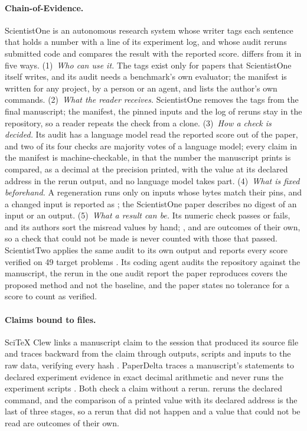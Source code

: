 \paragraph{Chain-of-Evidence.} ScientistOne \citep{meng2026scientistone} is an autonomous
research system whose writer tags each sentence that holds a number with a line of its
experiment log, and whose audit reruns submitted code and compares the result with the reported
score.  differs from it in five ways. (1)~\emph{Who can use it.} The
tags exist only for papers that ScientistOne itself writes, and its audit needs a benchmark's
own evaluator; the  manifest is written for any project, by a person or an agent, and
lists the author's own commands. (2)~\emph{What the reader receives.} ScientistOne removes the tags from
the final manuscript; the manifest, the pinned inputs and the log of reruns stay in the
repository, so a reader repeats the check from a clone. (3)~\emph{How a check is decided.} Its
audit has a language model read the reported score out of the paper, and two of its four checks
are majority votes of a language model; every claim in the manifest is machine-checkable, in
that the number the manuscript prints is compared, as a decimal at the precision printed, with
the value at its declared address in the rerun output, and no language model takes part. (4)~\emph{What is fixed beforehand.} A regeneration
runs only on inputs whose bytes match their pins, and a changed input is reported as
; the ScientistOne paper describes no digest of an input or an output. (5)~\emph{What a result can be.}
Its numeric check passes or fails, and its authors sort the misread values by hand;
,  and  are outcomes of their own, so a check that
could not be made is never counted with those that passed. ScientistTwo applies the same audit
to its own output and reports every score verified on 49 target problems
\citep{nam2026scientisttwo}. Its coding agent audits the repository against the manuscript, the
rerun in the one audit report the paper reproduces covers the proposed method and not the
baseline, and the paper states no tolerance for a score to count as verified.

\paragraph{Claims bound to files.} SciTeX Clew links a manuscript claim to the session that
produced its source file and traces backward from the claim through outputs, scripts and inputs
to the raw data, verifying every hash \citep{watanabe2026clew}. PaperDelta traces a manuscript's
statements to declared experiment evidence in exact decimal arithmetic and never runs the
experiment scripts \citep{paperdelta2026}. Both check a claim without a rerun.  reruns the declared command, and the comparison of a printed value with its declared
address is the last of three stages, so a rerun that did not happen and a value that could not be
read are outcomes of their own.

